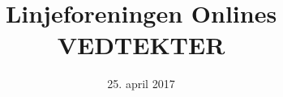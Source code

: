 \documentclass{vedtekter}
\title{\Large{}Linjeforeningen Onlines\\\Huge{VEDTEKTER}}
\date{
25. april 2017  %
\dobbelSignatur{Taran Ruge}{Endre Ulberg}  %
}
\begin{document}
\maketitle
\small{}
\tableofcontents
\newpage
\normalsize{}









\end{document}
